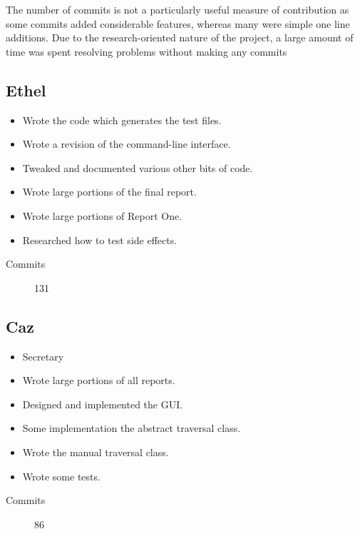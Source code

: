   The number of commits is not a particularly useful measure of contribution as some commits added considerable features, whereas many were simple one line additions. 
  Due to the research-oriented nature of the project, a large amount of time was spent resolving problems without making any commits

  \subsection{Ethel}
    \begin{itemize}
      \item Wrote the code which generates the test files.
      \item Wrote a revision of the command-line interface.
      \item Tweaked and documented various other bits of code.
      \item Wrote large portions of the final report.
      \item Wrote large portions of Report One.
      \item Researched how to test side effects.
    \end{itemize}
   
    \begin{description}
      \item[Commits] 131
    \end{description}

  \subsection{Caz}
    \begin{itemize}
    \item Secretary
    \item Wrote large portions of all reports.
    \item Designed and implemented the GUI.
    \item Some implementation the abstract traversal class.
    \item Wrote the manual traversal class.
    \item Wrote some tests.
    \end{itemize}
    \begin{description}
      \item[Commits] 86
    \end{description}

